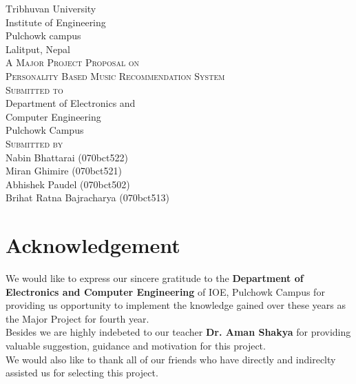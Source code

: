 \documentclass{article}
\begin{document}
\begin{titlepage}
  \begin{center}
    {\Huge\textsc Tribhuvan University}\\
    [0.03in]
    {\LARGE\textsc Institute of Engineering}\\
    [0.05in]
    {\Large\textsc Pulchowk campus}\\
    [0.02in]
    {\large\textsc Lalitput, Nepal}\\
    [2in]

    {\LARGE \textsc{A Major Project Proposal on}}\\
    [0.5cm]
    {\Large \textsc{Personality Based Music Recommendation System}}\\
    [1.8in]
    
    {\LARGE\textsc{Submitted to}}\\
    [0.05in]
    {\large Department of Electronics and }\\
    {\large Computer Engineering}\\
    {\large Pulchowk Campus}\\
    [1in]

    {\LARGE \textsc{\large Submitted by}}\\
    [0.05in]
    {\large Nabin Bhattarai (070bct522)}\\
    {\large Miran Ghimire (070bct521)}\\
    {\large Abhishek Paudel (070bct502)}\\
    {\large Brihat Ratna Bajracharya (070bct513)}\\
  \end{center}
\end{titlepage}

\setcounter{page}{2}

\section*{Acknowledgement}
	We would like to express our sincere gratitude to the \textbf{Department of Electronics and Computer Engineering }of IOE, Pulchowk Campus for providing us opportunity to implement the knowledge gained over these years as the Major Project for fourth year.\\ 
	Besides we are highly indebeted to our teacher \textbf{Dr. Aman Shakya} for providing valuable suggestion, guidance and motivation for this project.\\
We would also like to thank all of our friends who have directly and indireclty assisted us for selecting this project.
\cleardoublepage
\end{document}
